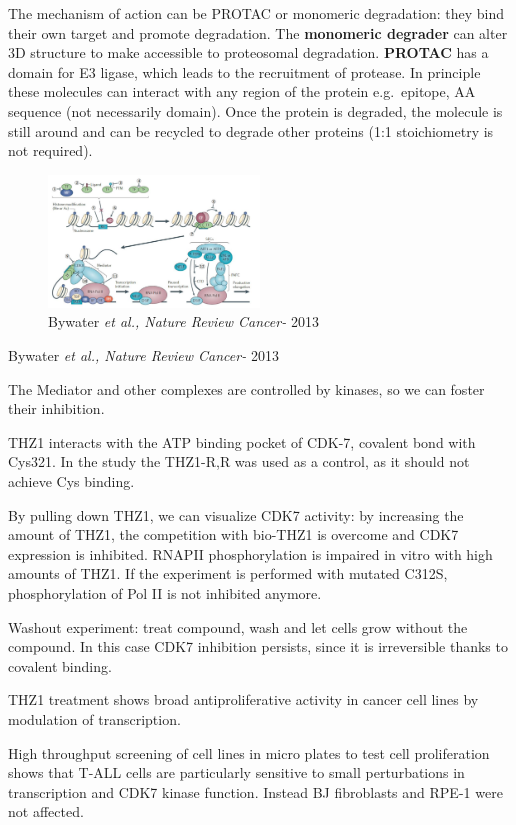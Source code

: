 The mechanism of action can be PROTAC or monomeric degradation: they bind their own target and promote degradation. The \textbf{monomeric degrader} can alter 3D structure to make accessible to proteosomal degradation. \textbf{PROTAC} has a domain for E3 ligase, which leads to the recruitment of protease. In principle these molecules can interact with any region of the protein e.g.~epitope, AA sequence (not necessarily domain). Once the protein is degraded, the molecule is still around and can be recycled to degrade other proteins (1:1 stoichiometry is not required).

\begin{figure}
\centering
\includegraphics[width=0.5\textwidth]{../_resources/Screen_Shot_2022-11-04_at_11-55-34.png}
\caption{Bywater \emph{et al., Nature Review Cancer-} 2013}
\end{figure}

Bywater \emph{et al., Nature Review Cancer-} 2013

The Mediator and other complexes are controlled by kinases, so we can foster their inhibition.

THZ1 interacts with the ATP binding pocket of CDK-7, covalent bond with Cys321. In the study the THZ1-R,R was used as a control, as it should not achieve Cys binding.

By pulling down THZ1, we can visualize CDK7 activity: by increasing the amount of THZ1, the competition with bio-THZ1 is overcome and CDK7 expression is inhibited. RNAPII phosphorylation is impaired in vitro with high amounts of THZ1. If the experiment is performed with mutated C312S, phosphorylation of Pol II is not inhibited anymore.

Washout experiment: treat compound, wash and let cells grow without the compound. In this case CDK7 inhibition persists, since it is irreversible thanks to covalent binding.

THZ1 treatment shows broad antiproliferative activity in cancer cell lines by modulation of transcription.

High throughput screening of cell lines in micro plates to test cell proliferation shows that T-ALL cells are particularly sensitive to small perturbations in transcription and CDK7 kinase function. Instead BJ fibroblasts and RPE-1 were not affected.

